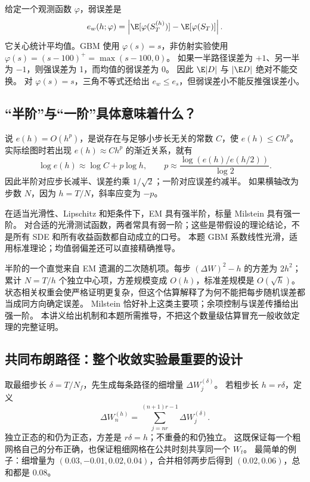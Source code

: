 给定一个观测函数 $\varphi$，弱误差是
\begin{equation}\label{eq:errors-weak}
 e_w(h;\varphi)=\left|\E[\varphi(S_T^{(h)})]-\E[\varphi(S_T)]\right|.
\end{equation}
它关心统计平均值。GBM 使用 $\varphi(s)=s$，非仿射实验使用 $\varphi(s)=(s-100)^+=\max(s-100,0)$。
如果一半路径误差为 $+1$、另一半为 $-1$，则强误差为 1，而均值的弱误差为 0。
因此 $\E|D|$ 与 $|\E D|$ 绝对不能交换。
对 $\varphi(s)=s$，三角不等式还给出 $e_w\le e_s$，但弱误差小不能反推强误差小。

\subsection{“半阶”与“一阶”具体意味着什么？}
说 $e(h)=O(h^p)$，是说存在与足够小步长无关的常数 $C$，使 $e(h)\le Ch^p$。
实际绘图时若出现 $e(h)\approx Ch^p$ 的渐近关系，就有
\begin{equation}\label{eq:errors-order}
 \log e(h)\approx\log C+p\log h,\qquad
 p\approx\frac{\log(e(h)/e(h/2))}{\log2}.
\end{equation}
因此半阶对应步长减半、误差约乘 $1/\sqrt2$；一阶对应误差约减半。
如果横轴改为步数 $N$，因为 $h=T/N$，斜率应变为 $-p$。

在适当光滑性、Lipschitz 和矩条件下，EM 具有强半阶，标量 Milstein 具有强一阶。
对合适的光滑测试函数，两者常具有弱一阶；这些是带假设的理论结论，不是所有 SDE 和所有收益函数都自动成立的口号。
本题 GBM 系数线性光滑，适用标准理论；均值弱偏差还可以直接精确推导。

半阶的一个直觉来自 EM 遗漏的二次随机项。每步 $(\Delta W)^2-h$ 的方差为 $2h^2$；
累计 $N=T/h$ 个独立中心项，方差规模变成 $O(h)$，标准差规模是 $O(\sqrt h)$。
状态相关权重会使严格证明更复杂，但这个估算解释了为何不能把每步随机误差都当成同方向确定误差。
Milstein 恰好补上这类主要项；余项控制与误差传播给出强一阶。
本讲义给出机制和本题所需推导，不把这个数量级估算冒充一般收敛定理的完整证明。

\subsection{共同布朗路径：整个收敛实验最重要的设计}
取最细步长 $\delta=T/N_f$，先生成每条路径的细增量 $\Delta W_j^{(\delta)}$。
若粗步长 $h=r\delta$，定义
\begin{equation}\label{eq:errors-coupling}
 \Delta W_n^{(h)}=\sum_{j=nr}^{(n+1)r-1}\Delta W_j^{(\delta)}.
\end{equation}
独立正态的和仍为正态，方差是 $r\delta=h$；不重叠的和仍独立。
这既保证每一个粗网格自己的分布正确，也保证粗细网格在公共时刻共享同一个 $W_t$。
最简单的例子：细增量为 $(0.03,-0.01,0.02,0.04)$，合并相邻两步后得到 $(0.02,0.06)$，总和都是 $0.08$。


